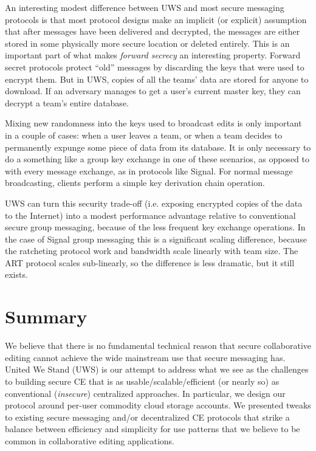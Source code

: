 \documentclass[runningheads]{llncs}
\begin{document}
An interesting modest difference between UWS and most secure messaging protocols is that most protocol designs make an implicit (or explicit) assumption that after messages have been delivered and decrypted, the messages are either stored in some physically more secure location or deleted entirely.
This is an important part of what makes \emph{forward secrecy} an interesting property.
Forward secret protocols protect ``old'' messages by discarding the keys that were used to encrypt them.
But in UWS, copies of all the teams' data are stored for anyone to download.
If an adversary manages to get a user's current master key, they can decrypt a team's entire database.

Mixing new randomness into the keys used to broadcast edits is only important in a couple of cases: when a user leaves a team, or when a team decides to permanently expunge some piece of data from its database.
It is only necessary to do a something like a group key exchange in one of these scenarios, as opposed to with every message exchange, as in protocols like Signal.
For normal message broadcasting, clients perform a simple key derivation chain operation.

UWS can turn this security trade-off (i.e. exposing encrypted copies of the data to the Internet) into a modest performance advantage relative to conventional secure group messaging, because of the less frequent key exchange operations.
In the case of Signal group messaging this is a significant scaling difference, because the ratcheting protocol work and bandwidth scale linearly with team size.
The ART protocol scales sub-linearly, so the difference is less dramatic, but it still exists.

\section{Summary}

We believe that there is no fundamental technical reason that secure collaborative editing cannot achieve the wide mainstream use that secure messaging has.
United We Stand (UWS) is our attempt to address what we see as the challenges to building secure CE that is as usable{\slash}scalable{\slash}efficient (or nearly so) as conventional (\emph{insecure}) centralized approaches.
In particular, we design our protocol around per-user commodity cloud storage accounts.
We presented tweaks to existing secure messaging and{\slash}or decentralized CE protocols that strike a balance between efficiency and simplicity for use patterns that we believe to be common in collaborative editing applications.



\end{document}
